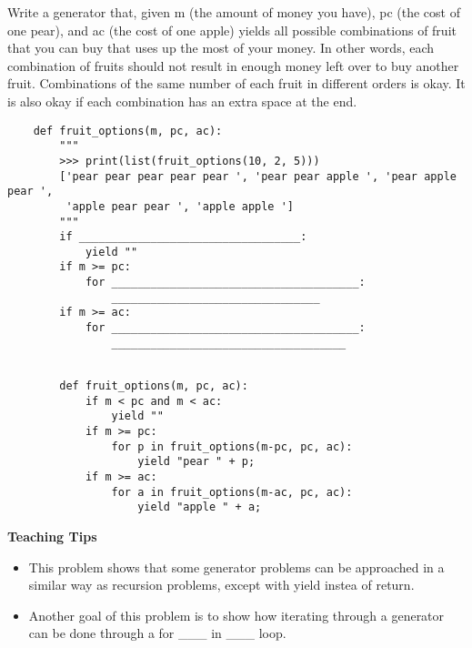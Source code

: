 \begin{blocksection}
    \question Write a generator that, given m (the amount of money you have), pc (the cost of one pear), and ac (the cost of one apple)
    yields all possible combinations of fruit that you can buy that uses up the most of your money. In other words, each combination of fruits
    should not result in enough money left over to buy another fruit. Combinations of the same number of each fruit in different orders is okay.
    It is also okay if each combination has an extra space at the end.
    
    \begin{lstlisting}
    def fruit_options(m, pc, ac):
        """
        >>> print(list(fruit_options(10, 2, 5)))
        ['pear pear pear pear pear ', 'pear pear apple ', 'pear apple pear ',
         'apple pear pear ', 'apple apple ']
        """
        if __________________________________:
            yield ""
        if m >= pc:
            for ______________________________________:
                ________________________________
        if m >= ac:
            for ______________________________________:
                ____________________________________
                
    \end{lstlisting}
    
    \begin{solution}[1in]
    \begin{lstlisting}
        def fruit_options(m, pc, ac): 
            if m < pc and m < ac:
                yield ""
            if m >= pc:
                for p in fruit_options(m-pc, pc, ac):
                    yield "pear " + p;
            if m >= ac:
                for a in fruit_options(m-ac, pc, ac):
                    yield "apple " + a;    
    \end{lstlisting}
    \end{solution}
    \end{blocksection}
    
    \begin{guide}
    \begin{blocksection}
        \textbf{Teaching Tips}
        \begin{itemize}
        \item This problem shows that some generator problems can be approached in a similar way as recursion problems, except with yield instea of return.
        \item Another goal of this problem is to show how iterating through a generator can be done through a for ___ in ___ loop.
        \end{itemize}
    \end{blocksection}
    \end{guide}